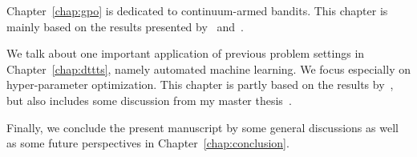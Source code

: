 Chapter~\ref{chap:gpo} is dedicated to continuum-armed bandits. This chapter is mainly based on the results presented by~\cite{shang2018adaptive} and~\cite{shang2019adaptive}.

We talk about one important application of previous problem settings in Chapter~\ref{chap:dttts}, namely \gls{automated machine learning}. We focus especially on hyper-parameter optimization. This chapter is partly based on the results by~\cite{shang2019dttts,shang2020dttts}, but also includes some discussion from my master thesis~\cite{shang2017master}.

Finally, we conclude the present manuscript by some general discussions as well as some future perspectives in Chapter~\ref{chap:conclusion}.

% 
% 
